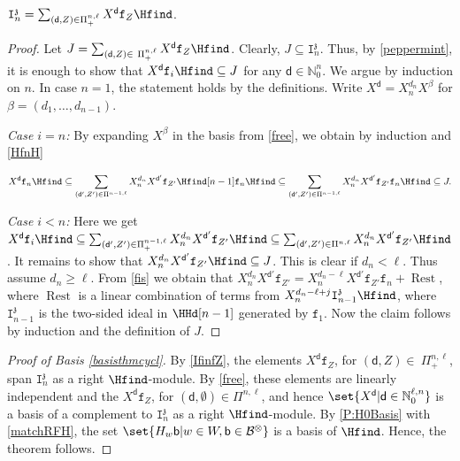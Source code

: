 \documentclass[a4paper,11pt]{amsart}
\newcommand\cB{\mathcal{B}}
\newcommand\cBo{\cB^{\otimes}}
\numberwithin{equation}{subsection}
\theoremstyle{definition}
\theoremstyle{theorem}
\theoremstyle{remark}
\newcommand\charge{{\mathfrak{z}}}
\newcommand\Ic[1][n]{\mathtt{I}^\charge_{#1}}
\newcommand\Sym{W}
\newcommand\bd{\mathsf{d}}
\newcommand\bb{\mathsf{b}}
\newcommand\op{\operatorname}
\newcommand\N{\mathbb{N}}
\begin{document}
\begin{Lemma}\label{IfinfZ}
$\Ic=\sum_{(\bd,Z)\in\Pi^{n,\ell}_+}X^\bd \mathtt{f}_Z\Hfind$.
\end{Lemma}
\begin{proof} Let $J=\sum_{(\bd,Z)\in\ \Pi^{n,\ell}_+}X^\bd \mathtt{f}_Z\Hfind$.
Clearly, $J\subseteq \Ic$.  Thus, by \autoref{peppermint}, it is enough
to show that $X^\bd \mathtt{f}_i\Hfind\subseteq J$ for any $\bd\in\mathbb{N}_0^n$. We argue by induction on $n$. In case $n=1$, the statement holds by the definitions.   Write  $X^\bd=X_n^{d_n}X^\beta$ for $\beta=(d_1,\ldots, d_{n-1})$.

{\it Case $i=n$:}  By expanding $X^\beta$ in the basis from \autoref{free}, we obtain by induction and \autoref{HfnH}

\[X^\bd \mathtt{f}_n\Hfind\subseteq\sum_{(\bd',Z')\in\Pi^{n-1,\ell}}X_n^{d_n}X^{\bd'}\mathtt{f}_{Z'}\Hfind[n-1]\mathtt{f}_n\Hfind\subseteq \sum_{(\bd',Z' )\in\Pi^{n-1,\ell}}X_n^{d_n}X^{\bd'}\mathtt{f}_{Z'}\mathtt{f}_n\Hfind\subseteq J.\]

{\it Case $i<n$:}  Here we get $X^\bd \mathtt{f}_i\Hfind\subseteq\sum_{(\bd',Z')\in\Pi^{n-1,\ell}_+}X_n^{d_n}X^{\bd'}\mathtt{f}_{Z'}\Hfind\subseteq \sum_{(\bd',Z' )\in\Pi^{n,\ell}}X_n^{d_n}X^{\bd'}\mathtt{f}_{Z'}\Hfind$. It remains to show that $X_n^{d_n}X^{\bd'}\mathtt{f}_{Z'}\Hfind\subseteq J$. This is clear if $d_n<\ell$.  Thus assume $d_n\geq \ell$. From  \autoref{fis} we obtain that
$X_n^{d_n}X^{\bd'}\mathtt{f}_{Z'}= X_n^{{d_n-\ell}}X^{\bd'}\mathtt{f}_{Z'}\mathtt{f}_n+\op{Rest}$, where $\op{Rest}$ is a linear combination of terms from $X_n^{d_n-\ell+j}\mathtt{I}_{n-1}^\charge\Hfind$, where $\Ic[n-1]$ is the two-sided ideal in $\HHd[n-1]$ generated by $\mathtt{f}_1$. Now the claim follows by induction and the definition of $J$.
\end{proof}

\begin{proof}[Proof of Basis \autoref{basisthmcycl}]
By \autoref{IfinfZ}, the elements $X^\bd \mathtt{f}_Z$, for
$(\bd,Z)\in\ \Pi^{n,\ell}_+$, span $\Ic$ as a right
$\Hfind$-module. By \autoref{free}, these elements are linearly independent and
the $X^\bd \mathtt{f}_Z$, for $(\bd,\emptyset)\in\Pi^{n,\ell}$, and hence
$\set{X^\bd|\bd\in\N^{\ell,n}_0}$ is a basis of a
complement to $\Ic$ as a right $\Hfind$-module. By \autoref{P:H0Basis} with \autoref{matchRFH},
 the set $\set{H_w \bb|w\in\Sym, \bb\in\cBo}$ is a basis of
$\Hfind$. Hence, the theorem follows.
\end{proof}
\end{document}
